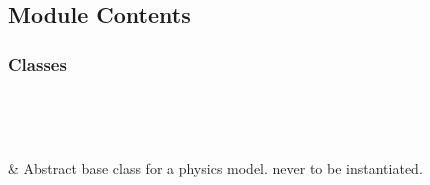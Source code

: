 \documentclass[letterpaper,10pt,english]{sphinxmanual}
\begin{document}
\section{}
\label{\detokenize{autoapi/Model/index:module-Model}}\label{\detokenize{autoapi/Model/index:model}}\label{\detokenize{autoapi/Model/index::doc}}

\subsection{Module Contents}
\label{\detokenize{autoapi/Model/index:module-contents}}

\subsubsection{Classes}
\label{\detokenize{autoapi/Model/index:classes}}

\begin{savenotes}\sphinxatlongtablestart\begin{longtable}[c]{}
\hline

\endfirsthead

%
{}\\
\hline

\endhead

\hline
{}\\
\endfoot

\endlastfoot

\sphinxAtStartPar
{\hyperref[\detokenize{autoapi/Model/index:Model.Model}]{}}
&
\sphinxAtStartPar
Abstract base class for a physics model. never to be instantiated.
\\
\hline
\end{longtable}\sphinxatlongtableend\end{savenotes}
\end{document}
